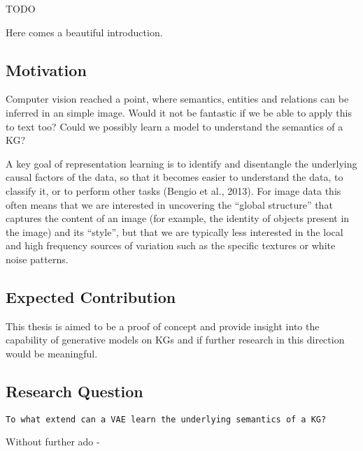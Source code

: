 
TODO

Here comes a beautiful introduction. %


\subsection{Motivation}

Computer vision reached a point, where semantics, entities and relations can be inferred in an simple image.
Would it not be fantastic if we be able to apply this to text too?
Could we possibly learn a model to understand the semantics of a KG?

A key goal of representation learning is to identify and disentangle the underlying causal factors of
the data, so that it becomes easier to understand the data, to classify it, or to perform other tasks
(Bengio et al., 2013). For image data this often means that we are interested in uncovering the
“global structure” that captures the content of an image (for example, the identity of objects present
in the image) and its “style”, but that we are typically less interested in the local and high frequency
sources of variation such as the specific textures or white noise patterns.

\subsection{Expected Contribution}

This thesis is aimed to be a proof of concept and provide insight into the capability of generative models on KGs and if further research in this direction would be meaningful.

\subsection{Research Question}

\texttt{To what extend can a VAE learn the underlying semantics of a KG?}


Without further ado -
